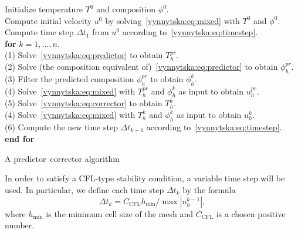 \begin{algorithm}
  \begin{tabbing}
    Initialize temperature $T^0$ and composition $\phi^0$. \\
    Compute initial velocity $u^0$ by
    solving~\eqref{vynnytska:eq:mixed} with $T^0$ and $\phi^0$. \\
    Compute time step $\Delta t_1$ from $u^0$ according
    to~\eqref{vynnytska:eq:timestep}. \\
    \textbf{for}  {$k = 1, \dots, n$}. \\
    \tab (1) Solve~\eqref{vynnytska:eq:predictor} to obtain $T_h^{pr}$. \\
    \tab (2) Solve (the composition equivalent
    of)~\eqref{vynnytska:eq:predictor} to obtain $\phi_h^{pr}$. \\
    \tab (3) Filter the predicted composition $\phi_h^{pr}$ to
    obtain $\phi_h^{k}$. \\
    \tab (4) Solve~\eqref{vynnytska:eq:mixed} with $T_h^{pr}$ and
    $\phi_h^{k}$ as input to obtain $u_h^{pr}$. \\
    \tab (5) Solve~\eqref{vynnytska:eq:corrector} to obtain $T_h^{k}$. \\
    \tab (4) Solve~\eqref{vynnytska:eq:mixed} with $T_h^{k}$ and
    $\phi_h^{k}$ as input to obtain $u_h^{k}$. \\
    \tab (6) Compute the new time step $\Delta t_{k+1}$ according
    to~\eqref{vynnytska:eq:timestep}. \\
    \textbf{end for}
  \end{tabbing}
  \caption{A predictor--corrector algorithm}
  \label{vynnytska:alg:algorithm}
\end{algorithm}

In order to satisfy a CFL-type stability condition, a variable time
step will be used. In particular, we define each time step $\Delta
t_k$ by the formula
\begin{equation}
   \label{vynnytska:eq:timestep}
   \Delta t_k =  C_{\mathrm{CFL}} h_{\min} / \max{|u^{k-1}_h|},
\end{equation}
where $h_{\min}$ is the minimum cell size of the mesh and
$C_{\mathrm{CFL}}$ is a chosen positive number.


